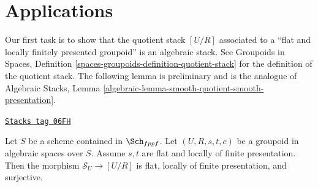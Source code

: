 \section{Applications}
\label{criteria-section-applications}
Our first task is to show that the quotient stack $[U/R]$ associated to
a ``flat and locally finitely presented groupoid'' is an algebraic stack.
See
Groupoids in Spaces,
Definition \ref{spaces-groupoids-definition-quotient-stack}
for the definition of the quotient stack.
The following lemma is preliminary and is the analogue of
Algebraic Stacks,
Lemma \ref{algebraic-lemma-smooth-quotient-smooth-presentation}.

\begin{lemma}
\label{criteria-lemma-flat-quotient-flat-presentation}
\href{https://stacks.math.columbia.edu/tag/06FH}{\texttt{Stacks tag 06FH}}

Let $S$ be a scheme contained in $\Sch_{fppf}$.
Let $(U, R, s, t, c)$ be a groupoid in algebraic spaces over $S$.
Assume $s, t$ are flat and locally of finite presentation.
Then the morphism $\mathcal{S}_U \to [U/R]$ is flat, locally of
finite presentation, and surjective.
\end{lemma}

